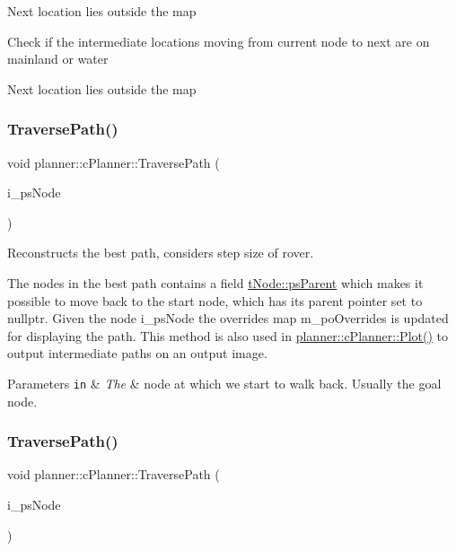 Next location lies outside the map

Check if the intermediate locations moving from current node to next are on mainland or water

Next location lies outside the map \mbox{\label{classplanner_1_1c_planner_a8624cb2afb8f2fd216c38b4424013178}} 
\subsubsection{\texorpdfstring{Traverse\+Path()}{TraversePath()}\hspace{0.1cm}{\footnotesize\ttfamily [1/2]}}
{\footnotesize\ttfamily void planner\+::c\+Planner\+::\+Traverse\+Path (\begin{DoxyParamCaption}\item[{std\+::shared\+\_\+ptr$<$ \mbox{\hyperlink{structplanner_1_1t_node}{t\+Node}} $>$ \&}]{i\+\_\+ps\+Node }\end{DoxyParamCaption})}



Reconstructs the best path, considers step size of rover. 

The nodes in the best path contains a field \mbox{\hyperlink{structplanner_1_1t_node_a626d33dc40af6be79e975d54200d77e8}{t\+Node\+::ps\+Parent}} which makes it possible to move back to the start node, which has its parent pointer set to nullptr. Given the node i\+\_\+ps\+Node the overrides map m\+\_\+po\+Overrides is updated for displaying the path. This method is also used in \mbox{\hyperlink{classplanner_1_1c_planner_a236a68e02c7a99323f2d30b3097aa767}{planner\+::c\+Planner\+::\+Plot()}} to output intermediate paths on an output image. 
\begin{DoxyParams}[1]{Parameters}
\mbox{\tt in}  & {\em The} & node at which we start to walk back. Usually the goal node. \\
\hline
\end{DoxyParams}
\mbox{\label{classplanner_1_1c_planner_a8624cb2afb8f2fd216c38b4424013178}} 
\subsubsection{\texorpdfstring{Traverse\+Path()}{TraversePath()}\hspace{0.1cm}{\footnotesize\ttfamily [2/2]}}
{\footnotesize\ttfamily void planner\+::c\+Planner\+::\+Traverse\+Path (\begin{DoxyParamCaption}\item[{std\+::shared\+\_\+ptr$<$ \mbox{\hyperlink{structplanner_1_1t_node}{t\+Node}} $>$ \&}]{i\+\_\+ps\+Node }\end{DoxyParamCaption})}



